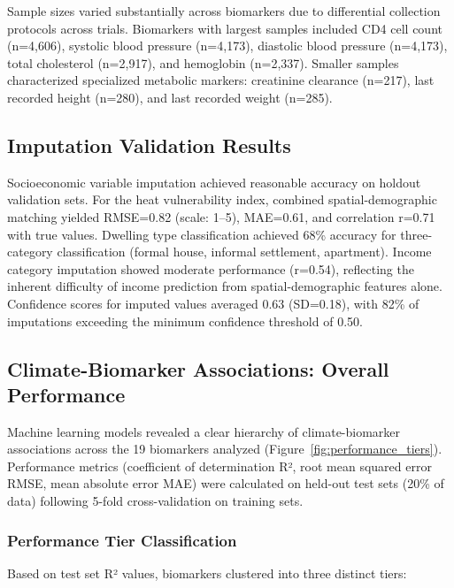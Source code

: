 Sample sizes varied substantially across biomarkers due to differential collection protocols across trials. Biomarkers with largest samples included CD4 cell count (n=4,606), systolic blood pressure (n=4,173), diastolic blood pressure (n=4,173), total cholesterol (n=2,917), and hemoglobin (n=2,337). Smaller samples characterized specialized metabolic markers: creatinine clearance (n=217), last recorded height (n=280), and last recorded weight (n=285).

\subsection{Imputation Validation Results}

Socioeconomic variable imputation achieved reasonable accuracy on holdout validation sets. For the heat vulnerability index, combined spatial-demographic matching yielded RMSE=0.82 (scale: 1--5), MAE=0.61, and correlation r=0.71 with true values. Dwelling type classification achieved 68\% accuracy for three-category classification (formal house, informal settlement, apartment). Income category imputation showed moderate performance (r=0.54), reflecting the inherent difficulty of income prediction from spatial-demographic features alone. Confidence scores for imputed values averaged 0.63 (SD=0.18), with 82\% of imputations exceeding the minimum confidence threshold of 0.50.

\subsection{Climate-Biomarker Associations: Overall Performance}

Machine learning models revealed a clear hierarchy of climate-biomarker associations across the 19 biomarkers analyzed (Figure~\ref{fig:performance_tiers}). Performance metrics (coefficient of determination R², root mean squared error RMSE, mean absolute error MAE) were calculated on held-out test sets (20\% of data) following 5-fold cross-validation on training sets.

\subsubsection{Performance Tier Classification}

Based on test set R² values, biomarkers clustered into three distinct tiers:

